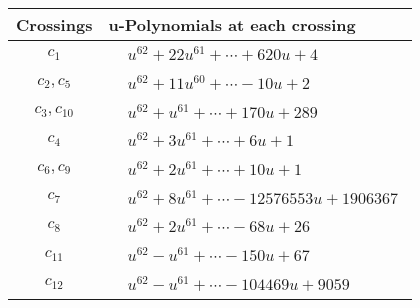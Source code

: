 \documentclass[1p]{elsarticle_modified}
\theoremstyle{definition}
\begin{document}
\begin{tabular}{m{50pt}|m{274pt}}
Crossings & \hspace{64pt}u-Polynomials at each crossing \\
\hline $$\begin{aligned}c_{1}\end{aligned}$$&$\begin{aligned}
&u^{62}+22 u^{61}+\cdots+620 u+4
\end{aligned}$\\
\hline $$\begin{aligned}c_{2},c_{5}\end{aligned}$$&$\begin{aligned}
&u^{62}+11 u^{60}+\cdots-10 u+2
\end{aligned}$\\
\hline $$\begin{aligned}c_{3},c_{10}\end{aligned}$$&$\begin{aligned}
&u^{62}+u^{61}+\cdots+170 u+289
\end{aligned}$\\
\hline $$\begin{aligned}c_{4}\end{aligned}$$&$\begin{aligned}
&u^{62}+3 u^{61}+\cdots+6 u+1
\end{aligned}$\\
\hline $$\begin{aligned}c_{6},c_{9}\end{aligned}$$&$\begin{aligned}
&u^{62}+2 u^{61}+\cdots+10 u+1
\end{aligned}$\\
\hline $$\begin{aligned}c_{7}\end{aligned}$$&$\begin{aligned}
&u^{62}+8 u^{61}+\cdots-12576553 u+1906367
\end{aligned}$\\
\hline $$\begin{aligned}c_{8}\end{aligned}$$&$\begin{aligned}
&u^{62}+2 u^{61}+\cdots-68 u+26
\end{aligned}$\\
\hline $$\begin{aligned}c_{11}\end{aligned}$$&$\begin{aligned}
&u^{62}- u^{61}+\cdots-150 u+67
\end{aligned}$\\
\hline $$\begin{aligned}c_{12}\end{aligned}$$&$\begin{aligned}
&u^{62}- u^{61}+\cdots-104469 u+9059
\end{aligned}$\\
\hline
\end{tabular}\\~\\
\end{document}
